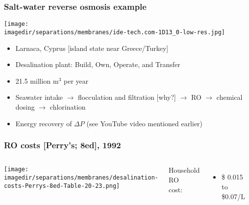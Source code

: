 \begin{frame}\frametitle{Salt-water reverse osmosis example}
	\texttt{[image: \\imagedir/separations/membranes/ide-tech.com-1D13\_0-low-res.jpg]}
	\begin{itemize}
		\item	Larnaca, Cyprus [island state near Greece/Turkey]
		\item	Desalination plant: Build, Own, Operate, and Transfer
		\item	21.5 million $\text{m}^3$ per year
		\item	Seawater intake $\rightarrow$ flocculation and filtration [why?] $\rightarrow$ RO $\rightarrow$ chemical dosing $\rightarrow$ chlorination
		\item	Energy recovery of $\Delta P$ {\tiny (see YouTube video mentioned earlier)}
	\end{itemize}
\end{frame}

\begin{frame}\frametitle{RO costs [Perry's; 8ed], 1992}
	\begin{columns}[t]
			\begin{center}
				\texttt{[image: \\imagedir/separations/membranes/desalination-costs-Perrys-8ed-Table-20-23.png]}
			\end{center}
			Household RO\\
			cost:
			\begin{itemize}
				\item	\$ 0.015 to \$0.07/L %
			\end{itemize}
	\end{columns}
\end{frame}

